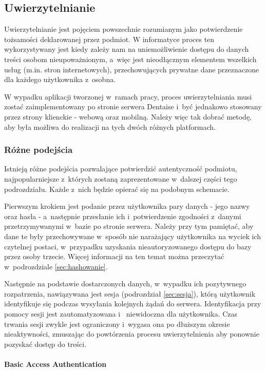 \documentclass[11pt]{aghdpl}
\begin{document}
\subsection{Uwierzytelnianie}

Uwierzytelnianie jest pojęciem powszechnie rozumianym jako potwierdzenie tożsamości deklarowanej przez podmiot. W informatyce proces ten wykorzystywany jest kiedy zależy nam na uniemożliwienie dostępu do danych treści osobom nieupoważnionym, a~więc jest nieodłącznym elementem wszelkich usług (m.in. stron internetowych), przechowujących prywatne dane przeznaczone dla każdego użytkownika z~osobna.

W wypadku aplikacji tworzonej w~ramach pracy, proces uwierzytelniania musi zostać zaimplementowany po stronie serwera Dentaise i~być jednakowo stosowany przez strony klienckie - webową oraz mobilną. Należy więc tak dobrać metodę, aby była możliwa do realizacji na tych dwóch różnych platformach.

\subsubsection{Różne podejścia}

Istnieją różne podejścia pozwalające potwierdzić autentyczność podmiotu, najpopularniejsze z~których zostaną zaprezentowane w~dalszej części tego podrozdziału. Każde z~nich będzie opierać się na podobnym schemacie. 

Pierwszym krokiem jest podanie przez użytkownika pary danych - jego nazwy oraz hasła - a~następnie przesłanie ich i~potwierdzenie zgodności z~danymi przetrzymywanymi w~bazie po stronie serwera. Należy przy tym pamiętać, aby dane te były przechowywane w~sposób nie narażający użytkownika na wyciek ich czytelnej postaci, w~przypadku uzyskania nieautoryzowanego dostępu do bazy przez osoby trzecie. Więcej informacji na ten temat można przeczytać w~podrozdziale \ref{sec:hashowanie}. 

Następnie na podstawie dostarczonych danych, w~wypadku ich pozytywnego rozpatrzenia, nawiązywana jest sesja (podrozdział \ref{sec:sesja}), którą użytkownik identyfikuje się  podczas wysyłania kolejnych żądań do serwera. Identyfikacja przy pomocy sesji jest zautomatyzowana i~ niewidoczna dla użytkownika. Czas trwania sesji zwykle jest ograniczony i~wygasa ona po dłuższym okresie nieaktywności, zmuszając do powtórzenia procesu uwierzytelnienia aby ponownie pozyskać dostęp do treści.

\paragraph{Basic Access Authentication}
\end{document}
